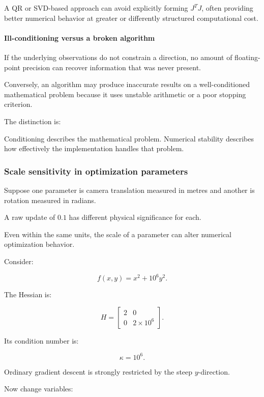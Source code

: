 A QR or SVD-based approach can avoid explicitly forming \(J^TJ\), often providing better numerical behavior at greater or differently structured computational cost.

\paragraph{Ill-conditioning versus a broken algorithm}\label{02-foundations-ii-ch027-ill-conditioning-versus-a-broken-algorithm}

If the underlying observations do not constrain a direction, no amount of floating-point precision can recover information that was never present.

Conversely, an algorithm may produce inaccurate results on a well-conditioned mathematical problem because it uses unstable arithmetic or a poor stopping criterion.

The distinction is:

Conditioning describes the mathematical problem. Numerical stability describes how effectively the implementation handles that problem.

\subsubsection{Scale sensitivity in optimization parameters}\label{02-foundations-ii-ch027-scale-sensitivity-in-optimization-parameters}

Suppose one parameter is camera translation measured in metres and another is rotation measured in radians.

A raw update of \(0.1\) has different physical significance for each.

Even within the same units, the scale of a parameter can alter numerical optimization behavior.

Consider:

\[
f(x,y)=x^2+10^6y^2.
\]

The Hessian is:

\[
H= \begin{bmatrix} 2&0\\ 0&2\times10^6 \end{bmatrix}.
\]

Its condition number is:

\[
\kappa=10^6.
\]

Ordinary gradient descent is strongly restricted by the steep \(y\)-direction.

Now change variables:

